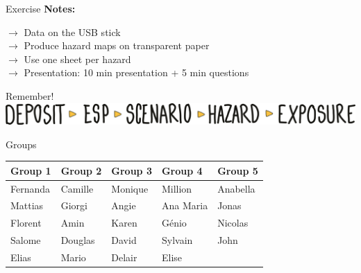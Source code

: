 \documentclass[10pt,aspectratio=169]{beamer}
\begin{document}
\begin{frame}{Exercise}
    \centering \textbf{Notes:} \\ \vspace*{2em}

    $\rightarrow$ Data on the \alert{USB stick} \\ \vspace*{1em}
    $\rightarrow$ Produce hazard maps on \alert{transparent} paper \\ \vspace*{1em}
    $\rightarrow$ Use \alert{one sheet} per hazard \\ \vspace*{1em}
    $\rightarrow$ \alert{Presentation}: 10 min presentation + 5 min questions  \\ \vspace*{1em}
\end{frame}

    
\begin{frame}{Remember!}
    \includegraphics[width=\textwidth]{Fig/workflow1.png}
\end{frame}
 

\begin{frame}{Groups}
    \centering
    \begin{table}[htbp]
        \begin{tabular}{m{6em} m{6em} m{6em} m{6em} m{6em} }
            \hline
        \textbf{\alert{Group 1}}  & \textbf{\alert{Group 2}}  & \textbf{\alert{Group 3}}  & \textbf{\alert{Group 4}}  & \textbf{\alert{Group 5}}  \\ \hline
        Fernanda                  & Camille                   & Monique                   & Million                   & Anabella                  \\
        Mattias                   & Giorgi                    & Angie                     & Ana Maria                 & Jonas                     \\
        Florent                   & Amin                      & Karen                     & Génio                     & Nicolas                   \\
        Salome                    & Douglas                   & David                     & Sylvain                   & John                      \\
        Elias                     & Mario                     & Delair                    & Elise                     &                           \\
        \hline
        \end{tabular}%
    \end{table}%
  
  \end{frame}
  
\end{document}
